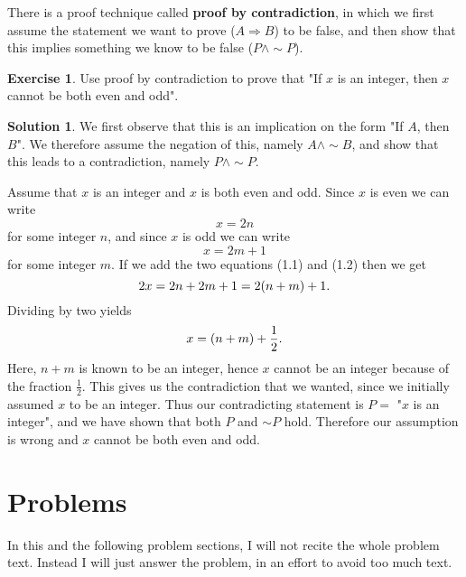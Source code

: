 \documentclass[a4paper, 11pt]{report}
\theoremstyle{plain}
\theoremstyle{definition}
\newtheorem{exrc}[thm]{Exercise}
\newtheorem*{sltn}{Solution}
\newcommand{\impl}{\Longrightarrow}
\renewcommand{\neg}{{\sim}} %
\begin{document}
There is a proof technique called \textbf{proof by contradiction}, in which we first assume the statement we want to prove ($A
\impl B$) to be false, and then show that this implies something we know to be
false ($P \land \neg P$).

\begin{exrc}
  Use proof by contradiction to prove that "If $x$ is an integer, then $x$
  cannot be both even and odd".
\end{exrc}
\begin{sltn}
  We first observe that this is an implication on the form "If $A$, then $B$".
  We therefore assume the negation of this, namely $A \land \neg B$, and show
  that this leads to a contradiction, namely $P \land \neg P$.

  Assume that $x$ is an integer and $x$ is both even and odd. Since $x$ is even we can write
  \begin{equation}
    x = 2n
  \end{equation}
  for some integer $n$, and since $x$ is odd we can write
  \begin{equation}
    x = 2m + 1
  \end{equation}
  for some integer $m$. If we add the two equations (1.1) and (1.2) then we get
  \begin{equation}
    \notag
    2x = 2n + 2m + 1 = 2(n + m) + 1.
  \end{equation}
  Dividing by two yields
  \begin{equation}
    \notag
    x = (n + m) + \frac{1}{2}.
  \end{equation}
  Here, $n + m$ is known to be an integer, hence $x$ cannot be an integer
  because of the fraction $\frac{1}{2}$. This gives us the contradiction that
  we wanted, since we initially assumed $x$ to be an integer. Thus our
  contradicting statement is $P = $ "$x$ is an integer", and we have shown that
  both $P$ and $\neg P$ hold. Therefore our assumption is wrong and $x$ cannot
  be both even and odd.
\end{sltn}

\section*{Problems}
\label{sec:problems_1}

In this and the following problem sections, I will not recite the whole problem
text. Instead I will just answer the problem, in an effort to avoid too much
text.
\end{document}
